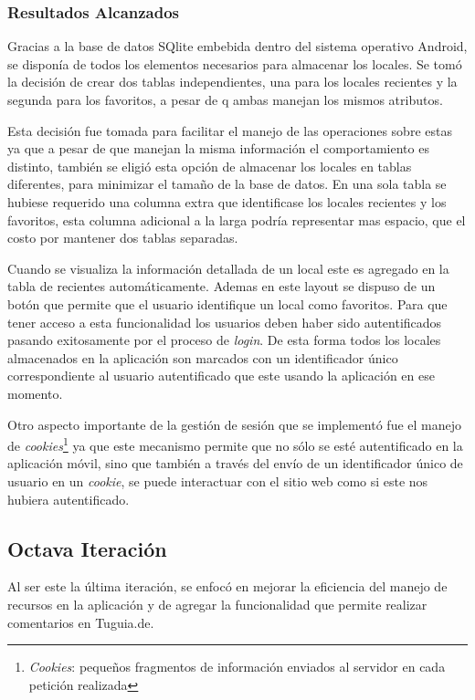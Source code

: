 \subsubsection{Resultados Alcanzados}

Gracias a la base de datos SQlite embebida dentro del sistema operativo Android, se disponía de todos los elementos necesarios para almacenar los locales. Se tomó la decisión de crear dos tablas independientes, una para los locales recientes y la segunda para los favoritos, a pesar de q ambas manejan los mismos atributos.

Esta decisión fue tomada para facilitar el manejo de las operaciones sobre estas ya que a pesar de que manejan la misma información el comportamiento es distinto, también se eligió esta opción de almacenar los locales en tablas diferentes, para minimizar el tamaño de la base de datos. En una sola tabla se hubiese requerido una columna extra que identificase los locales recientes y los favoritos, esta columna adicional a la larga podría representar mas espacio, que el costo por mantener dos tablas separadas.

Cuando se visualiza la información detallada de un local este es agregado en la tabla de recientes automáticamente. Ademas en este layout se dispuso de un botón que permite que el usuario identifique un local como favoritos. Para que tener acceso a esta funcionalidad los usuarios deben haber sido autentificados pasando exitosamente por el proceso de \textit{login}. De esta forma todos los locales almacenados en la aplicación son marcados con un identificador único correspondiente al usuario autentificado que este usando la aplicación en ese momento. 

Otro aspecto importante de la gestión de sesión que se implementó fue el manejo de \textit{cookies}\footnote{\textit{Cookies}: pequeños fragmentos de información enviados al servidor en cada petición realizada} ya que este mecanismo permite que no sólo se esté autentificado en la aplicación móvil, sino que también a través del envío de un identificador único de usuario en un \textit{cookie}, se puede interactuar con el sitio web como si este nos hubiera autentificado.

\subsection{Octava Iteración}

Al ser este la última iteración, se enfocó en mejorar la eficiencia del manejo de recursos en la aplicación y de agregar la funcionalidad que permite realizar comentarios en Tuguia.de.

